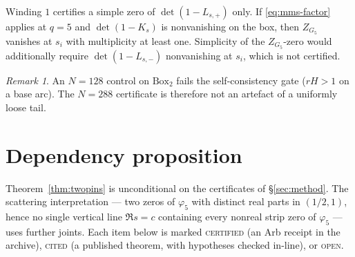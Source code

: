 \documentclass[11pt]{amsart}
\theoremstyle{definition}
\theoremstyle{remark}
\newtheorem*{remark}{Remark}
\newcommand{\phif}{\varphi_5}
\newcommand{\Zf}{Z_{G_5}}
\newcommand{\detp}{\det(1-L_{s,+})}
\begin{document}
Winding $1$ certifies a simple zero of $\detp$ only. If
\eqref{eq:mms-factor} applies at $q=5$ and $\det(1-K_s)$ is
nonvanishing on the box, then $\Zf$ vanishes at $s_i$ with
multiplicity at least one. Simplicity of the $\Zf$-zero would
additionally require $\det(1-L_{s,-})$ nonvanishing at $s_i$, which
is not certified.

\begin{remark}
An $N=128$ control on $\mathrm{Box}_2$ fails the self-consistency
gate ($rH>1$ on a base arc). The $N=288$ certificate is therefore
not an artefact of a uniformly loose tail.
\end{remark}

\section{Dependency proposition}
\label{sec:joints}

Theorem~\ref{thm:twopins} is unconditional on the certificates of
\S\ref{sec:method}. The scattering interpretation --- two zeros of
$\phif$ with distinct real parts in $(1/2,1)$, hence no single
vertical line $\Re s=c$ containing every nonreal strip zero of
$\phif$ --- uses further joints. Each item below is marked
\textsc{certified} (an Arb receipt in the archive),
\textsc{cited} (a published theorem, with hypotheses checked
in-line), or \textsc{open}.
\end{document}
